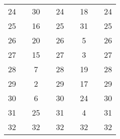 \begin{footnotesize}
\begin{tabular}{ccccccccc}
   24   & &  30   & &  24   & &  18   & &  24   \\
   25   & &  16   & &  25   & &  31   & &  25   \\
   26   & &  20   & &  26   & &   5   & &  26   \\
   27   & &  15   & &  27   & &   3   & &  27   \\
   28   & &   7   & &  28   & &  19   & &  28   \\
   29   & &   2   & &  29   & &  17   & &  29   \\
   30   & &   6   & &  30   & &  24   & &  30   \\
   31   & &  25   & &  31   & &   4   & &  31   \\
   32   & &  32   & &  32   & &  32   & &  32   \\
\end{tabular}
\end{footnotesize}
